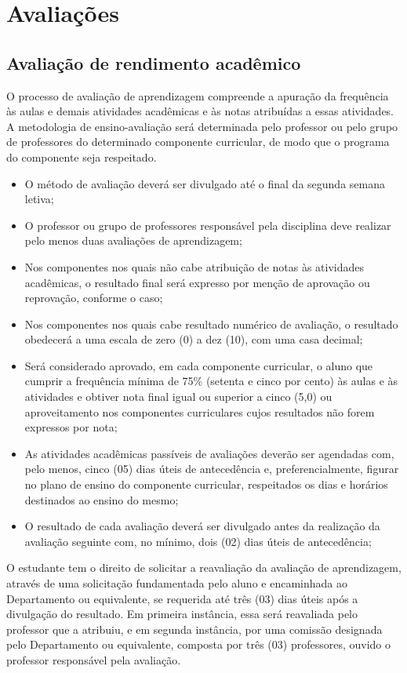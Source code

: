\chapter{Avaliações}
\section{Avaliação de rendimento acadêmico}

O processo de avaliação de aprendizagem compreende a apuração da frequência às aulas e demais atividades acadêmicas e às notas atribuídas a essas atividades. A metodologia de ensino-avaliação será determinada pelo professor ou pelo grupo de professores do determinado componente curricular, de modo que o programa do componente seja respeitado.

\begin{itemize}
        \item O método de avaliação deverá ser divulgado até o final da segunda semana letiva;
        \item O professor ou grupo de professores responsável pela disciplina deve realizar pelo menos duas avaliações de aprendizagem;
        \item Nos componentes nos quais não cabe atribuição de notas às atividades acadêmicas, o resultado final será expresso por menção de aprovação ou reprovação, conforme o caso;
        \item Nos componentes nos quais cabe resultado numérico de avaliação, o resultado obedecerá a uma escala de zero (0) a dez (10), com uma casa decimal;
        \item Será considerado aprovado, em cada componente curricular, o aluno que cumprir a frequência mínima de 75\% (setenta e cinco por cento) às aulas e às atividades e obtiver nota final igual ou superior a cinco (5,0) ou aproveitamento nos componentes curriculares cujos resultados não forem expressos por nota;
        \item As atividades acadêmicas passíveis de avaliações deverão ser agendadas com, pelo menos, cinco (05) dias úteis de antecedência e, preferencialmente, figurar no plano de ensino do componente curricular, respeitados os dias e horários destinados ao ensino do mesmo;
        \item O resultado de cada avaliação deverá ser divulgado antes da realização da avaliação seguinte com, no mínimo, dois (02) dias úteis de antecedência;
\end{itemize}

O estudante tem o direito de solicitar a reavaliação da avaliação de aprendizagem, através de uma solicitação fundamentada pelo aluno e encaminhada ao Departamento ou equivalente, se requerida até três (03) dias úteis após a divulgação do resultado. Em primeira instância, essa será reavaliada pelo professor que a atribuiu, e em segunda instância, por uma comissão designada pelo Departamento ou equivalente, composta por três (03) professores, ouvido o professor responsável pela avaliação.

